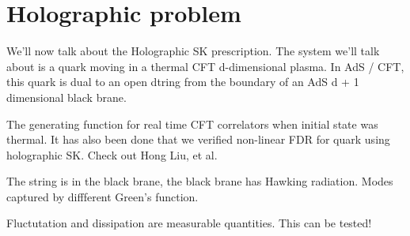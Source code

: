 \documentclass[11pt, a4paper]{article}   	%
\theoremstyle{slplain}
\begin{document}
\section{Holographic problem} 
We'll now talk about the Holographic SK prescription. 
The system we'll talk about 
is a quark moving in a thermal CFT d-dimensional plasma. 
In AdS / CFT, this quark is dual to an open dtring from the boundary 
of an AdS d + 1 dimensional black brane.

The generating function for real time CFT correlators when initial 
state was thermal. It has also been done that 
we verified non-linear FDR for quark using holographic SK.
Check out Hong Liu, et al.

The string is in the black brane, the black brane has Hawking radiation. 
Modes captured by diffferent Green's function. 

Fluctutation and dissipation are 
measurable quantities. This can be tested! 
\end{document}

